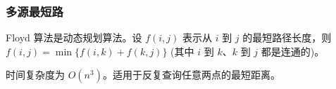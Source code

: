 \subsubsection{多源最短路}
    Floyd 算法是动态规划算法。设 $f(i,j)$ 表示从 $i$ 到 $j$ 的最短路径长度，则 $f(i,j)=\min\{f(i,k)+f(k,j)\}$ (其中 $i$ 到 $k$、$k$ 到 $j$ 都是连通的)。
    
    时间复杂度为 $O(n^{3})$。适用于反复查询任意两点的最短距离。
    
    
